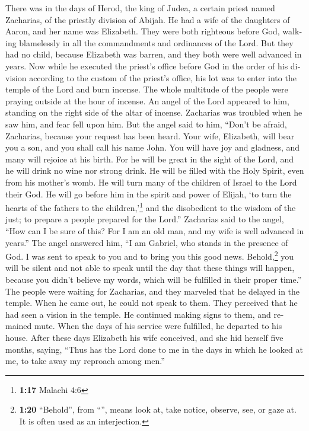\begin{paracol}{2}
\begin{otherlanguage}{english}
 There was in the days of Herod, the king of Judea, a
certain priest named Zacharias, of the priestly division of Abijah. He
had a wife of the daughters of Aaron, and her name was Elizabeth.
 They were both righteous before God, walking blamelessly
in all the commandments and ordinances of the Lord.  But
they had no child, because Elizabeth was barren, and they both were well
advanced in years.  Now while he executed the priest's
office before God in the order of his division  according
to the custom of the priest's office, his lot was to enter into the
temple of the Lord and burn incense.  The whole multitude
of the people were praying outside at the hour of incense.
 An angel of the Lord appeared to him, standing on the
right side of the altar of incense.  Zacharias was
troubled when he saw him, and fear fell upon him.  But
the angel said to him, ``Don't be afraid, Zacharias, because your
request has been heard. Your wife, Elizabeth, will bear you a son, and
you shall call his name John.  You will have joy and
gladness, and many will rejoice at his birth.  For he
will be great in the sight of the Lord, and he will drink no wine nor
strong drink. He will be filled with the Holy Spirit, even from his
mother's womb.  He will turn many of the children of
Israel to the Lord their God.  He will go before him in
the spirit and power of Elijah, `to turn the hearts of the fathers to
the children,'\footnote{\textbf{1:17} Malachi 4:6} and the disobedient
to the wisdom of the just; to prepare a people prepared for the Lord.''
 Zacharias said to the angel, ``How can I be sure of
this? For I am an old man, and my wife is well advanced in years.''
 The angel answered him, ``I am Gabriel, who stands in
the presence of God. I was sent to speak to you and to bring you this
good news.  Behold,\footnote{\textbf{1:20} ``Behold'',
  from ``'', means look at, take notice, observe, see, or
  gaze at. It is often used as an interjection.} you will be silent and
not able to speak until the day that these things will happen, because
you didn't believe my words, which will be fulfilled in their proper
time.''  The people were waiting for Zacharias, and they
marveled that he delayed in the temple.  When he came
out, he could not speak to them. They perceived that he had seen a
vision in the temple. He continued making signs to them, and remained
mute.  When the days of his service were fulfilled, he
departed to his house.  After these days Elizabeth his
wife conceived, and she hid herself five months, saying, 
``Thus has the Lord done to me in the days in which he looked at me, to
take away my reproach among men.''


\end{otherlanguage}
\end{paracol}
